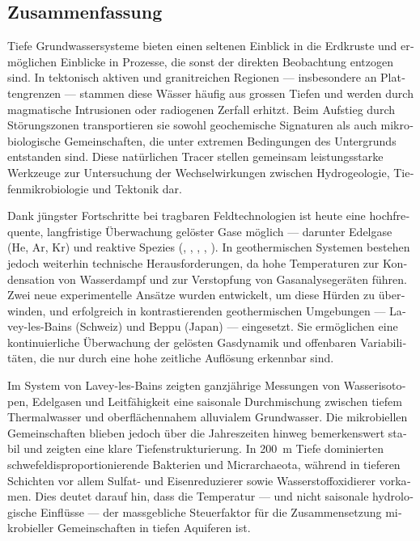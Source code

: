 \begin{otherlanguage}{ngerman}
\chapter*{Zusammenfassung}

Tiefe Grundwassersysteme bieten einen seltenen Einblick in die Erdkruste und ermöglichen Einblicke in Prozesse, die sonst der direkten Beobachtung entzogen sind.
In tektonisch aktiven und granitreichen Regionen --- insbesondere an Plattengrenzen --- stammen diese Wässer häufig aus grossen Tiefen und werden durch magmatische Intrusionen oder radiogenen Zerfall erhitzt.
Beim Aufstieg durch Störungszonen transportieren sie sowohl geochemische Signaturen als auch mikrobiologische Gemeinschaften, die unter extremen Bedingungen des Untergrunds entstanden sind.
Diese natürlichen Tracer stellen gemeinsam leistungsstarke Werkzeuge zur Untersuchung der Wechselwirkungen zwischen Hydrogeologie, Tiefenmikrobiologie und Tektonik dar.

Dank jüngster Fortschritte bei tragbaren Feldtechnologien ist heute eine hochfrequente, langfristige Überwachung gelöster Gase möglich --- darunter Edelgase (He, Ar, Kr) und reaktive Spezies (, , , , ).
In geothermischen Systemen bestehen jedoch weiterhin technische Herausforderungen, da hohe Temperaturen zur Kondensation von Wasserdampf und zur Verstopfung von Gasanalysegeräten führen.
Zwei neue experimentelle Ansätze wurden entwickelt, um diese Hürden zu überwinden, und erfolgreich in kontrastierenden geothermischen Umgebungen --- Lavey-les-Bains (Schweiz) und Beppu (Japan) --- eingesetzt.
Sie ermöglichen eine kontinuierliche Überwachung der gelösten Gasdynamik und offenbaren Variabilitäten, die nur durch eine hohe zeitliche Auflösung erkennbar sind.

Im System von Lavey-les-Bains zeigten ganzjährige Messungen von Wasserisotopen, Edelgasen und Leitfähigkeit eine saisonale Durchmischung zwischen tiefem Thermalwasser und oberflächennahem alluvialem Grundwasser.
Die mikrobiellen Gemeinschaften blieben jedoch über die Jahreszeiten hinweg bemerkenswert stabil und zeigten eine klare Tiefenstrukturierung.
In \SI{200}{\metre} Tiefe dominierten schwefeldisproportionierende Bakterien und Micrarchaeota, während in tieferen Schichten vor allem Sulfat- und Eisenreduzierer sowie Wasserstoffoxidierer vorkamen.
Dies deutet darauf hin, dass die Temperatur --- und nicht saisonale hydrologische Einflüsse --- der massgebliche Steuerfaktor für die Zusammensetzung mikrobieller Gemeinschaften in tiefen Aquiferen ist.


\end{otherlanguage}
